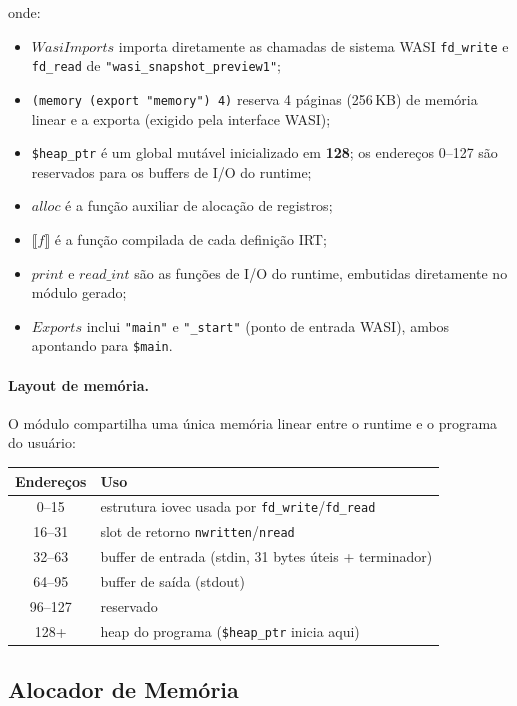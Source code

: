 onde:
\begin{itemize}
  \item $\mathit{WasiImports}$ importa diretamente as chamadas de sistema WASI
    \texttt{fd\_write} e \texttt{fd\_read} de \texttt{"wasi\_snapshot\_preview1"};
  \item \texttt{(memory (export "memory") 4)} reserva 4 páginas (256\,KB) de
    memória linear e a exporta (exigido pela interface WASI);
  \item \texttt{\$heap\_ptr} é um global mutável inicializado em \textbf{128};
    os endereços 0–127 são reservados para os buffers de I/O do runtime;
  \item $\mathit{alloc}$ é a função auxiliar de alocação de registros;
  \item $\llbracket f \rrbracket$ é a função compilada de cada definição IRT;
  \item $\mathit{print}$ e $\mathit{read\_int}$ são as funções de I/O do
    runtime, embutidas diretamente no módulo gerado;
  \item $\mathit{Exports}$ inclui \texttt{"main"} e \texttt{"\_start"} (ponto
    de entrada WASI), ambos apontando para \texttt{\$main}.
\end{itemize}

\paragraph{Layout de memória.} O módulo compartilha uma única memória linear
entre o runtime e o programa do usuário:

\begin{center}
\begin{tabular}{cl}
\hline
\textbf{Endereços} & \textbf{Uso} \\
\hline
0–15   & estrutura iovec usada por \texttt{fd\_write}/\texttt{fd\_read} \\
16–31  & slot de retorno \texttt{nwritten}/\texttt{nread} \\
32–63  & buffer de entrada (stdin, 31 bytes úteis + terminador) \\
64–95  & buffer de saída (stdout) \\
96–127 & reservado \\
128+   & heap do programa (\texttt{\$heap\_ptr} inicia aqui) \\
\hline
\end{tabular}
\end{center}

\subsection{Alocador de Memória}\label{subsec:alloc}

